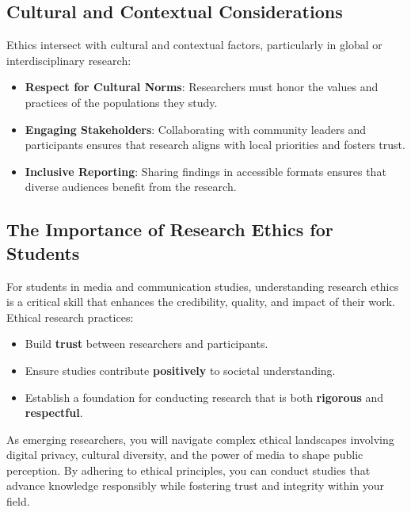 \documentclass[
]{book}
\providecommand{\tightlist}{%
  \setlength{\itemsep}{0pt}\setlength{\parskip}{0pt}}
\begin{document}
\subsection*{Cultural and Contextual Considerations}\label{cultural-and-contextual-considerations}

Ethics intersect with cultural and contextual factors, particularly in global or interdisciplinary research:

\begin{itemize}
\tightlist
\item
  \textbf{Respect for Cultural Norms}: Researchers must honor the values and practices of the populations they study.
\item
  \textbf{Engaging Stakeholders}: Collaborating with community leaders and participants ensures that research aligns with local priorities and fosters trust.
\item
  \textbf{Inclusive Reporting}: Sharing findings in accessible formats ensures that diverse audiences benefit from the research.
\end{itemize}

\subsection*{The Importance of Research Ethics for Students}\label{the-importance-of-research-ethics-for-students}

For students in media and communication studies, understanding research ethics is a critical skill that enhances the credibility, quality, and impact of their work. Ethical research practices:

\begin{itemize}
\tightlist
\item
  Build \textbf{trust} between researchers and participants.
\item
  Ensure studies contribute \textbf{positively} to societal understanding.
\item
  Establish a foundation for conducting research that is both \textbf{rigorous} and \textbf{respectful}.
\end{itemize}

As emerging researchers, you will navigate complex ethical landscapes involving digital privacy, cultural diversity, and the power of media to shape public perception. By adhering to ethical principles, you can conduct studies that advance knowledge responsibly while fostering trust and integrity within your field.
\end{document}
